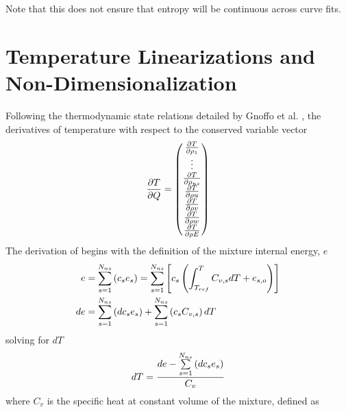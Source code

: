 Note that this does not ensure that entropy will be continuous across curve
fits.

\section{Temperature Linearizations and Non-Dimensionalization}
\label{temperature-Jacobian-conditioning}

Following the thermodynamic state relations detailed by Gnoffo et al.
\cite{gnoffo-tp}, the derivatives of temperature with respect to the conserved
variable vector
\begin{equation}
  \frac{\partial T}{\partial Q} =
  \begin{pmatrix}
    \frac{\partial T}{\partial \rho_1} \\
    \vdots \\
    \frac{\partial T}{\partial \rho_{ns}} \\
    \frac{\partial T}{\partial \rho u} \\
    \frac{\partial T}{\partial \rho v} \\
    \frac{\partial T}{\partial \rho w} \\
    \frac{\partial T}{\partial \rho E}
  \end{pmatrix}
  \label{tjac}
\end{equation}
The derivation of  begins with the definition of the mixture internal
energy, $e$
\begin{align}
  e &= \sum\limits_{s=1}^{N_{ns}} \left( c_s e_s \right) 
  = \sum\limits_{s=1}^{N_{ns}} \left[ c_s \left( \int_{T_{ref}}^{T} C_{v,s} dT + e_{s,o} \right)\right]
  \label{int-energy} \\
  de &= \sum\limits_{s=1}^{N_{ns}} \left( dc_s e_s \right) + \sum\limits_{s=1}^{N_{ns}} \left( c_s C_{v,s} \right) dT
  \label{dint-energy}
\end{align}
solving  for $dT$
\begin{equation}
  dT = \frac{de - \sum\limits_{s=1}^{N_{ns}} \left( dc_s e_s \right)}{C_v}
  \label{dt-de}
\end{equation}
where $C_v$ is the specific heat at constant volume of the mixture, defined as
